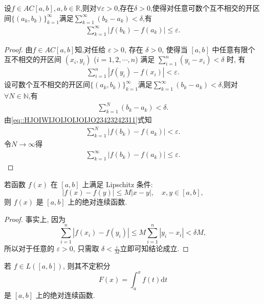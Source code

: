 \documentclass[../../main.tex]{subfiles}%
\begin{document}
\begin{proposition}\label{proposition:绝对连续函数对至多可数个开区间也成立}
设$f\in AC[a,b],a,b\in \mathbb{R}$,则对$\forall \varepsilon >0$,存在$\delta>0$,使得对任意可数个互不相交的开区间$\{(a_k,b_k)\}_{k=1}^{\infty}$满足$\sum\limits_{k=1}^{\infty}(b_k-a_k)<\delta$,有
\begin{align*}
\sum\limits_{k=1}^{\infty}\left|f(b_k)-f(a_k)\right|\leqslant \varepsilon .
\end{align*}
\end{proposition}
\begin{proof}

由$f\in AC[a,b]$知,对任给 $\varepsilon>0$, 存在 $\delta>0$, 使得当 $[a,b]$ 中任意有限个互不相交的开区间 $(x_i,y_i)$ ($i=1,2,\cdots,n$) 满足 $\sum_{i=1}^n (y_i-x_i) < \delta$ 时, 有
\begin{align}\label{eq::HJOIWIJOIJOIJOIJO23423242311}
\sum_{i=1}^n |f(y_i)-f(x_i)| < \varepsilon.
\end{align}
设可数个互不相交的开区间$\{(a_k,b_k)\}_{k=1}^{\infty}$满足$\sum\limits_{k=1}^{\infty}(b_k-a_k)<\delta$,则对$\forall N \in \mathbb{N}$,有
\begin{align*}
\sum\limits_{k=1}^{N}(b_k-a_k)<\delta.
\end{align*}
由\eqref{eq::HJOIWIJOIJOIJOIJO23423242311}式知
\begin{align*}
\sum_{k=1}^N |f(b_k)-f(a_k)| < \varepsilon.
\end{align*}
令$N\to \infty$得
\begin{align*}
\sum\limits_{k=1}^{\infty}\left|f(b_k)-f(a_k)\right|\leqslant \varepsilon .
\end{align*}
\end{proof}

\begin{proposition}\label{proposition:Lipschitz连续一定绝对连续}
若函数 $f(x)$ 在 $[a,b]$ 上满足 Lipschitz 条件:
\[
|f(x)-f(y)| \leqslant M|x-y|,\quad x,y\in[a,b],
\]
则 $f(x)$ 是 $[a,b]$ 上的绝对连续函数. 
\end{proposition}
\begin{proof}

事实上, 因为
\[
\sum_{i=1}^n |f(x_i)-f(y_i)| \leqslant M\sum_{i=1}^n |y_i-x_i| < \delta M,
\]
所以对于任意的 $\varepsilon>0$, 只需取 $\delta<\frac{\varepsilon}{M}$立即可知结论成立.

\end{proof}

\begin{theorem}
若 $f\in L([a,b])$, 则其不定积分
\[
F(x) = \int_a^x f(t)\mathrm{d}t
\]
是 $[a,b]$ 上的绝对连续函数.
\end{theorem}
\end{document}

